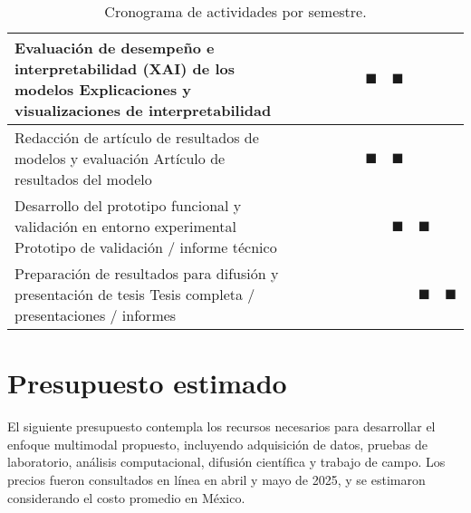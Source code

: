 \begin{landscape}
\begin{table}[h]
\begin{tabular}{|p{10cm}|c|c|c|c|c|c|c|c|}
\hline
Evaluación de desempeño e interpretabilidad (XAI) de los modelos \newline [OE4, OE5] Explicaciones y visualizaciones de interpretabilidad &  &  &  &  & $\blacksquare$ & $\blacksquare$ &  &  \\
\hline
Redacción de artículo de resultados de modelos y evaluación \newline [OE3, OE4, OE5] Artículo de resultados del modelo &  &  &  &  & $\blacksquare$ & $\blacksquare$ &  &  \\
\hline
Desarrollo del prototipo funcional y validación en entorno experimental \newline  [OE6] Prototipo de validación / informe técnico &  &  &  &  &  & $\blacksquare$ & $\blacksquare$ &  \\
\hline
Preparación de resultados para difusión y presentación de tesis \newline  [OE6] Tesis completa / presentaciones / informes &  &  &  &  &  &  & $\blacksquare$ & $\blacksquare$ \\
\hline
\end{tabular}
\caption{Cronograma de actividades por semestre.}
\label{tab:cronograma}
\end{table}
\end{landscape}


\section{Presupuesto estimado}

El siguiente presupuesto contempla los recursos necesarios para desarrollar el enfoque multimodal propuesto, incluyendo adquisición de datos, pruebas de laboratorio, análisis computacional, difusión científica y trabajo de campo. Los precios fueron consultados en línea en abril y mayo de 2025, y se estimaron considerando el costo promedio en México.\\

